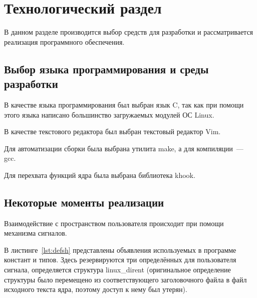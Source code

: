 \chapter{Технологический раздел}%
\label{cha:tekhnologicheskii_razdel}

В данном разделе производится выбор средств для разработки и рассматривается реализация программного обеспечения.

\section{Выбор языка программирования и среды разработки}%
\label{sec:vybor_iazyka_programmirovaniia_i_sredy_razrabotki}

В качестве языка программирования был выбран язык C, так как при помощи этого языка написано большинство загружаемых модулей ОС Linux.

В качестве текстового редактора был выбран текстовый редактор Vim.

Для автоматизации сборки была выбрана утилита make, а для компиляции~--- gcc.

Для перехвата функций ядра была выбрана библиотека khook.

\section{Некоторые моменты реализации}%
\label{sec:nekotorye_momenty_realizatsii}

Взаимодействие с пространством пользователя происходит при помощи механизма сигналов.

В листинге~\ref{lst:defsh} представлены объявления используемых в программе констант и типов. Здесь резервируются три определённых для пользователя сигнала, определяется структура linux\_dirent (оригинальное определение структуры было перемещено из соответствующего заголовочного файла в файл исходного текста ядра, поэтому доступ к нему был утерян).

